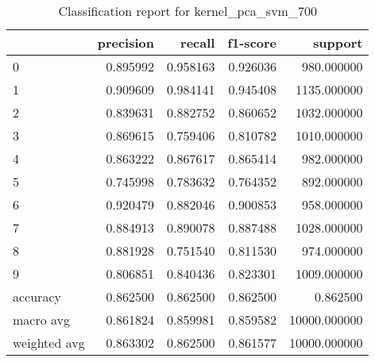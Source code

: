 \begin{table}[htb!]
\centering
\caption{Classification report for kernel_pca_svm_700}
\label{tab:classification-report-kernel_pca_svm_700}
\begin{tabular}{lrrrr}
\toprule
 & precision & recall & f1-score & support \\
\midrule
0 & 0.895992 & 0.958163 & 0.926036 & 980.000000 \\
1 & 0.909609 & 0.984141 & 0.945408 & 1135.000000 \\
2 & 0.839631 & 0.882752 & 0.860652 & 1032.000000 \\
3 & 0.869615 & 0.759406 & 0.810782 & 1010.000000 \\
4 & 0.863222 & 0.867617 & 0.865414 & 982.000000 \\
5 & 0.745998 & 0.783632 & 0.764352 & 892.000000 \\
6 & 0.920479 & 0.882046 & 0.900853 & 958.000000 \\
7 & 0.884913 & 0.890078 & 0.887488 & 1028.000000 \\
8 & 0.881928 & 0.751540 & 0.811530 & 974.000000 \\
9 & 0.806851 & 0.840436 & 0.823301 & 1009.000000 \\
accuracy & 0.862500 & 0.862500 & 0.862500 & 0.862500 \\
macro avg & 0.861824 & 0.859981 & 0.859582 & 10000.000000 \\
weighted avg & 0.863302 & 0.862500 & 0.861577 & 10000.000000 \\
\bottomrule
\end{tabular}
\end{table}
